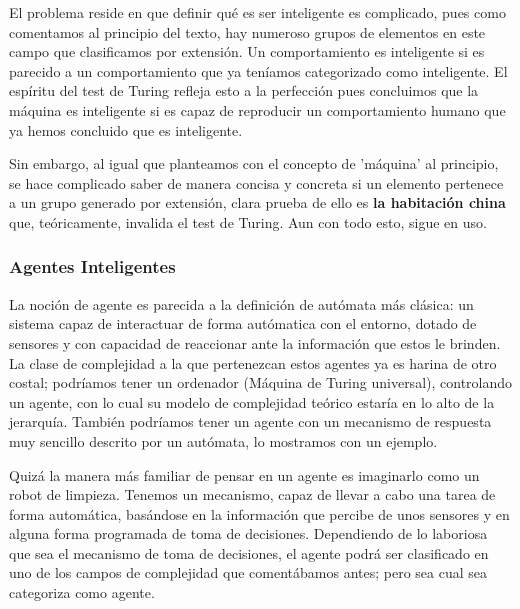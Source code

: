 \vspace{10px}

El problema reside en que definir qué es ser inteligente es complicado, pues como comentamos al principio del texto, hay numeroso grupos de elementos en este campo que clasificamos por extensión. Un comportamiento es inteligente si es parecido a un comportamiento que ya teníamos categorizado como inteligente. El espíritu del test de Turing refleja esto a la perfección pues concluimos que la máquina es inteligente si es capaz de reproducir un comportamiento humano que ya hemos concluido que es inteligente. 

\vspace{10px}

Sin embargo, al igual que planteamos con el concepto de 'máquina' al principio, se hace complicado saber de manera concisa y concreta si un elemento pertenece a un grupo generado por extensión, clara prueba de ello es \textbf{la habitación china} que, teóricamente, invalida el test de Turing. Aun con todo esto, sigue en uso.

\subsubsection{Agentes Inteligentes}


La noción de agente es parecida a la definición de autómata más clásica: un sistema capaz de interactuar de forma autómatica con el entorno, dotado de sensores y con capacidad de reaccionar ante la información que estos le brinden. La clase de complejidad a la que pertenezcan estos agentes ya es harina de otro costal; podríamos tener un ordenador (Máquina de Turing universal), controlando un agente, con lo cual su modelo de complejidad teórico estaría en lo alto de la jerarquía. También podríamos tener un agente con un mecanismo de respuesta muy sencillo descrito por un autómata, lo mostramos con un ejemplo.


\vspace{10px}

Quizá la manera más familiar de pensar en un agente es imaginarlo como un robot de limpieza. Tenemos un mecanismo, capaz de llevar a cabo una tarea de forma automática, basándose en la información que percibe de unos sensores y en alguna forma programada de toma de decisiones. Dependiendo de lo laboriosa que sea el mecanismo de toma de decisiones, el agente podrá ser clasificado en uno de los campos de complejidad que comentábamos antes; pero sea cual sea categoriza como agente.


